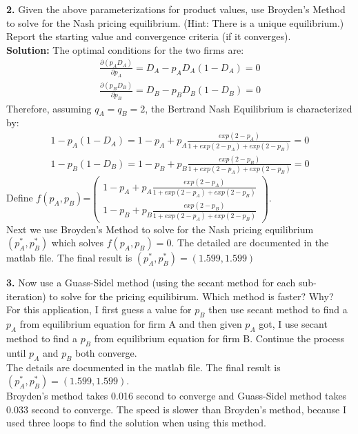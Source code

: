 \documentclass[10pt]{article}
\begin{document}
\noindent
\textbf{2.}
Given the above parameterizations for product values, use Broyden's Method to solve for the Nash pricing equilibrium. (Hint: There is a unique equilibrium.) Report the starting value and convergence criteria (if it converges).\\[2em]
\noindent
\textbf{Solution:} The optimal conditions for the two firms are: \\
\begin{align*}
\frac{\partial (p_A D_A)}{\partial p_A}=D_A- p_A D_A(1-D_A)=0 \\
\frac{\partial (p_B D_B)}{\partial p_B}=D_B- p_B D_B(1-D_B)=0
\end{align*} 
Therefore, assuming $q_A=q_B=2$, the Bertrand Nash Equilibrium is characterized by:\\
\begin{align*}
1- p_A (1-D_A)=1-p_A+  p_A \frac{exp(2 - p_A)}{1 + exp(2 - p_A) + exp(2 - p_B)} =  0 \\
1- p_B (1-D_B)= 1-p_B+  p_B \frac{exp(2 - p_B)}{1 + exp(2  - p_A) + exp(2 - p_B)} = 0
\end{align*} 
Define $f(p_A, p_B)$=$ %
\begin{pmatrix}
1 -p_A+ p_A \frac{exp(2 - p_A)}{1 + exp(2 - p_A) + exp(2 - p_B)} \\
1- p_B+ p_B \frac{exp(2 - p_B)}{1 + exp(2  - p_A) + exp(2 - p_B)}  
\end{pmatrix}%
$. 
\vspace{1em} \\
Next we use Broyden's Method to solve for the Nash pricing equilibrium $(p^*_A, p^*_B)$ which solves $f(p_A, p_B)=0$. The detailed are documented in the matlab file. The final result is $(p^*_A, p^*_B)=(1.599, 1.599)$ 



\vspace{2em}


\noindent
\textbf{3.}
Now use a Guass-Sidel method (using the secant method for each sub-iteration) to solve for the pricing equilibirum. Which method is faster? Why?\\[2em]
For this application, I first guess a value for $p_B$ then use secant method to find a $p_A$ from equilibrium equation for firm A and then given $p_A$ got, I use secant method to find a $p_B$ from equilibrium equation for firm B. Continue the process until $p_A$ and $p_B$ both converge. \\
The details are documented in the matlab file. The final result is $(p^*_A, p^*_B)=(1.599, 1.599)$. \\
Broyden's method takes 0.016 second to converge and Guass-Sidel method takes 0.033 second to converge. The speed is slower than Broyden's method, because I used three loops to find the solution when using this method. \\
\end{document}

